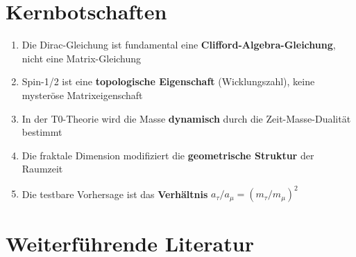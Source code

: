 	\begin{table}[h]
		\centering
		\caption{Vergleich: Standard vs. T0 Dirac-Formulierung}
	\end{table}
	
	\section{Kernbotschaften}
	
	\begin{enumerate}
		\item Die Dirac-Gleichung ist fundamental eine \textbf{Clifford-Algebra-Gleichung}, 
		nicht eine Matrix-Gleichung
		
		\item Spin-1/2 ist eine \textbf{topologische Eigenschaft} (Wicklungszahl), 
		keine mysteröse Matrixeigenschaft
		
		\item In der T0-Theorie wird die Masse \textbf{dynamisch} durch die 
		Zeit-Masse-Dualität bestimmt
		
		\item Die fraktale Dimension modifiziert die \textbf{geometrische Struktur} 
		der Raumzeit
		
		\item Die testbare Vorhersage ist das \textbf{Verhältnis} 
		$a_\tau/a_\mu = (m_\tau/m_\mu)^2$
	\end{enumerate}
	
	\section*{Weiterführende Literatur}
	

